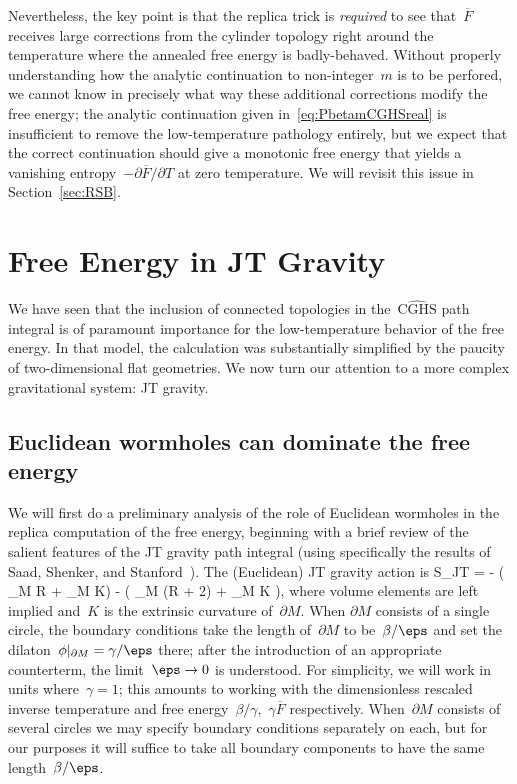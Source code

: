 \documentclass[12pt]{article}
\begin{document}
Nevertheless, the key point is that the replica trick is \textit{required} to see that~$\overline{F}$ receives large corrections from the cylinder topology right around the temperature where the annealed free energy is badly-behaved.  Without properly understanding how the analytic continuation to non-integer~$m$ is to be perfored, we cannot know in precisely what way these additional corrections modify the free energy; the analytic continuation given in~\eqref{eq:PbetamCGHSreal} is insufficient to remove the low-temperature pathology entirely, but we expect that the correct continuation should give a monotonic free energy that yields a vanishing entropy~$-\partial \overline{F}/\partial T$ at zero temperature.  We will revisit this issue in Section~\ref{sec:RSB}.



\section{Free Energy in JT Gravity}
\label{sec:JT}

We have seen that the inclusion of connected topologies in the~$\widehat{\mathrm{CGHS}}$ path integral is of paramount importance for the low-temperature behavior of the free energy.  In that model, the calculation was substantially simplified by the paucity of two-dimensional flat geometries.  We now turn our attention to a more complex gravitational system: JT gravity.


\subsection{Euclidean wormholes can dominate the free energy}

We will first do a preliminary analysis of the role of Euclidean wormholes in the replica computation of the free energy, beginning with a brief review of the salient features of the JT gravity path integral (using specifically the results of Saad, Shenker, and Stanford~\cite{SSS}).  The (Euclidean) JT gravity action is
\be
\label{eq:JTaction}
S_{JT} = - \left( \int_M R + \int_{\partial M} K\right) - \left( \int_M \phi(R + 2) + \int_{\partial M} \phi K \right),
\ee
where volume elements are left implied and~$K$ is the extrinsic curvature of~$\partial M$.  When $\partial M$ consists of a single circle, the boundary conditions take the length of~$\partial M$ to be~$\beta/\eps$ and set the dilaton~$\phi|_{\partial M} = \gamma/\eps$ there; after the introduction of an appropriate counterterm, the limit~$\eps \to 0$ is understood.  For simplicity, we will work in units where~$\gamma = 1$; this amounts to working with the dimensionless rescaled inverse temperature and free energy~$\beta/\gamma$,~$\gamma \overline{F}$ respectively.  When~$\partial M$ consists of several circles we may specify boundary conditions separately on each, but for our purposes it will suffice to take all boundary components to have the same length~$\beta/\eps$.
\end{document}
